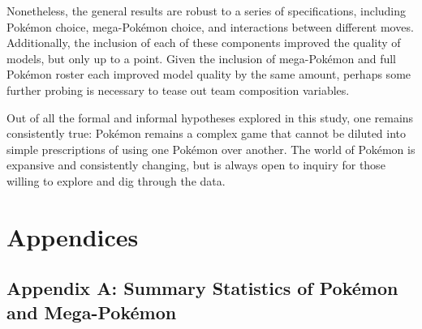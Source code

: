 \documentclass[12pt,twoside]{reedthesis}
\begin{document}
  Nonetheless, the general results are robust to a series of
  specifications, including Pokémon choice, mega-Pokémon choice, and
  interactions between different moves. Additionally, the inclusion of
  each of these components improved the quality of models, but only up to
  a point. Given the inclusion of mega-Pokémon and full Pokémon roster
  each improved model quality by the same amount, perhaps some further
  probing is necessary to tease out team composition variables.
  
  Out of all the formal and informal hypotheses explored in this study,
  one remains consistently true: Pokémon remains a complex game that
  cannot be diluted into simple prescriptions of using one Pokémon over
  another. The world of Pokémon is expansive and consistently changing,
  but is always open to inquiry for those willing to explore and dig
  through the data.
  
  \chapter{Appendices}\label{appendices}
  
  \section{Appendix A: Summary Statistics of Pokémon and
  Mega-Pokémon}\label{appendix-a-summary-statistics-of-pokemon-and-mega-pokemon}
  
\end{document}
